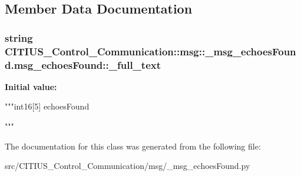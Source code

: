 \subsection{\-Member \-Data \-Documentation}
\hypertarget{class_c_i_t_i_u_s___control___communication_1_1msg_1_1__msg__echoes_found_1_1msg__echoes_found_ad4b974f61aa41ac07fae8a3dbddc7edd}{
\subsubsection[{\-\_\-full\-\_\-text}]{\setlength{\rightskip}{0pt plus 5cm}string \-C\-I\-T\-I\-U\-S\-\_\-\-Control\-\_\-\-Communication\-::msg\-::\-\_\-msg\-\_\-echoes\-Found.\-msg\-\_\-echoes\-Found\-::\-\_\-full\-\_\-text}}\label{class_c_i_t_i_u_s___control___communication_1_1msg_1_1__msg__echoes_found_1_1msg__echoes_found_ad4b974f61aa41ac07fae8a3dbddc7edd}
{\bfseries \-Initial value\-:}
\begin{DoxyCode}
"""int16[5] echoesFound

"""
\end{DoxyCode}


\-The documentation for this class was generated from the following file\-:\begin{DoxyCompactItemize}
\item 
src/\-C\-I\-T\-I\-U\-S\-\_\-\-Control\-\_\-\-Communication/msg/\-\_\-msg\-\_\-echoes\-Found.\-py\end{DoxyCompactItemize}
